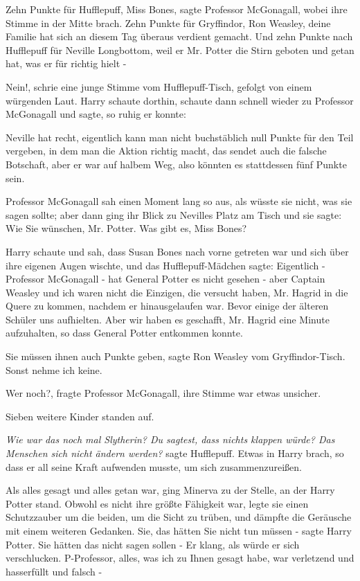 \glqq{}Zehn Punkte für Hufflepuff, Miss Bones\grqq{}, sagte Professor McGonagall,
wobei ihre Stimme in der Mitte brach. \glqq{}Zehn Punkte für Gryffindor, Ron
Weasley, deine Familie hat sich an diesem Tag überaus verdient gemacht. Und zehn
Punkte nach Hufflepuff für Neville Longbottom, weil er Mr. Potter die Stirn
geboten und getan hat, was er für richtig hielt -\grqq{}

\glqq{}Nein!\grqq{}, schrie eine junge Stimme vom Hufflepuff-Tisch, gefolgt von
einem würgenden Laut. Harry schaute dorthin, schaute dann schnell wieder zu
Professor McGonagall und sagte, so ruhig er konnte:

\glqq{}Neville hat recht, eigentlich kann man nicht buchstäblich null Punkte für
den Teil vergeben, in dem man die Aktion richtig macht, das sendet auch die
falsche Botschaft, aber er war auf halbem Weg, also könnten es stattdessen fünf
Punkte sein.\grqq{}

Professor McGonagall sah einen Moment lang so aus, als wüsste sie nicht, was sie
sagen sollte; aber dann ging ihr Blick zu Nevilles Platz am Tisch und sie sagte:
\glqq{}Wie Sie wünschen, Mr. Potter. Was gibt es, Miss Bones?\grqq{}

Harry schaute und sah, dass Susan Bones nach vorne getreten war und sich über
ihre eigenen Augen wischte, und das Hufflepuff-Mädchen sagte: \glqq{}Eigentlich -
Professor McGonagall - hat General Potter es nicht gesehen - aber Captain
Weasley und ich waren nicht die Einzigen, die versucht haben, Mr. Hagrid in die
Quere zu kommen, nachdem er hinausgelaufen war. Bevor einige der älteren Schüler
uns aufhielten. Aber wir haben es geschafft, Mr. Hagrid eine Minute aufzuhalten,
so dass General Potter entkommen konnte.\grqq{}

\glqq{}Sie müssen ihnen auch Punkte geben\grqq{}, sagte Ron Weasley vom
Gryffindor-Tisch. \glqq{}Sonst nehme ich keine.\grqq{}

\glqq{}Wer noch?\grqq{}, fragte Professor McGonagall, ihre Stimme war etwas
unsicher.

Sieben weitere Kinder standen auf.

\emph{Wie war das noch mal Slytherin? Du sagtest, dass nichts klappen würde? Das
Menschen sich nicht ändern werden?} sagte Hufflepuff. Etwas in Harry brach, so
dass er all seine Kraft aufwenden musste, um sich zusammenzureißen.

Als alles gesagt und alles getan war, ging Minerva zu der Stelle, an der Harry
Potter stand. Obwohl es nicht ihre größte Fähigkeit war, legte sie einen
Schutzzauber um die beiden, um die Sicht zu trüben, und dämpfte die Geräusche
mit einem weiteren Gedanken. \glqq{}Sie, das hätten Sie nicht tun müssen -\grqq{}
sagte Harry Potter. \glqq{}Sie hätten das nicht sagen sollen -\grqq{} Er klang,
als würde er sich verschlucken. \glqq{}P-Professor, alles, was ich zu Ihnen
gesagt habe, war verletzend und hasserfüllt und falsch -\grqq{}

